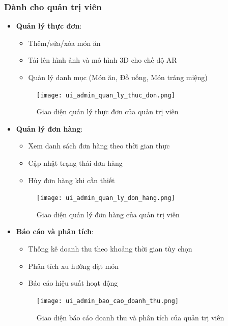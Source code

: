 \documentclass[12pt,a4paper]{article}
\begin{document}
\subsubsection{Dành cho quản trị viên}
\begin{itemize}[leftmargin=1cm]
    \item \textbf{Quản lý thực đơn}:
        \begin{itemize}[leftmargin=0.5cm]
            \item Thêm/sửa/xóa món ăn
            \item Tải lên hình ảnh và mô hình 3D cho chế độ AR
            \item Quản lý danh mục (Món ăn, Đồ uống, Món tráng miệng)
        \end{itemize}
\begin{figure}[H]
    \centering
    \texttt{[image: ui\_admin\_quan\_ly\_thuc\_don.png]} %
    \caption{Giao diện quản lý thực đơn của quản trị viên}
    \label{fig:ui_admin_menu}
\end{figure}

    \item \textbf{Quản lý đơn hàng}:
        \begin{itemize}[leftmargin=0.5cm]
            \item Xem danh sách đơn hàng theo thời gian thực
            \item Cập nhật trạng thái đơn hàng
            \item Hủy đơn hàng khi cần thiết
        \end{itemize}
\begin{figure}[H]
    \centering
    \texttt{[image: ui\_admin\_quan\_ly\_don\_hang.png]} %
    \caption{Giao diện quản lý đơn hàng của quản trị viên}
    \label{fig:ui_admin_orders}
\end{figure}

    \item \textbf{Báo cáo và phân tích}:
        \begin{itemize}[leftmargin=0.5cm]
            \item Thống kê doanh thu theo khoảng thời gian tùy chọn
            \item Phân tích xu hướng đặt món
            \item Báo cáo hiệu suất hoạt động
        \end{itemize}
\begin{figure}[H]
    \centering
    \texttt{[image: ui\_admin\_bao\_cao\_doanh\_thu.png]} %
    \caption{Giao diện báo cáo doanh thu và phân tích của quản trị viên}
    \label{fig:ui_admin_revenue}
\end{figure}


\end{itemize}
\end{document}
